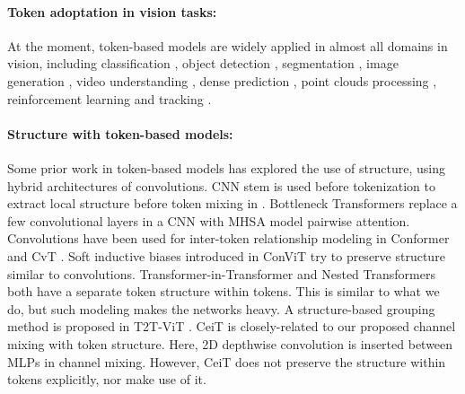 \documentclass[10pt,twocolumn,letterpaper]{article}
\begin{document}
\paragraph{Token adoptation in vision tasks:} At the moment, token-based models are widely applied in almost all domains in vision, including classification \cite{dosovitskiy2020image, touvron2021deit, liu2021swin}, object detection \cite{zhu2020deformable, carion2020end, dai2021up}, segmentation \cite{xie2021segformer, duke2021sstvos}, image generation \cite{liang2021swinir, cao2021video, esser2021taming, jiang2021transgan, deng2021stytr}, video understanding \cite{lee2020parameter, nagrani2021attention, fan2021multiscale, girdhar2021anticipative, bertasius2021space, akbari2021vatt, liu2021video, arnab2021vivit, zhang2021vidtr, liu2021end, chen2021mm, sharir2021image}, dense prediction \cite{yang2021transformer, ranftl2021vision}, point clouds processing \cite{zhao2021point, guo2021pct}, reinforcement learning \cite{chen2021decision, janner2021reinforcement} and tracking \cite{sun2020transtrack}.

\paragraph{Structure with token-based models:} Some prior work in token-based models has explored the use of structure, using hybrid architectures of convolutions. CNN stem is used before tokenization to extract local structure before token mixing in \cite{xiao2021early}. Bottleneck Transformers replace a few convolutional layers in a CNN with MHSA \cite{srinivas2021bottleneck} model pairwise attention. Convolutions have been used for inter-token relationship modeling in Conformer \cite{peng2021conformer} and CvT \cite{wu2021cvt}. Soft inductive biases introduced in ConViT \cite{d2021convit} try to preserve structure similar to convolutions. Transformer-in-Transformer \cite{han2021transformer} and Nested Transformers \cite{zhang2021aggregating} both have a separate token structure within tokens. This is similar to what we do, but such modeling makes the networks heavy. A structure-based grouping method is proposed in T2T-ViT \cite{yuan2021tokens}. CeiT \cite{yuan2021incorporating} is closely-related to our proposed channel mixing with token structure. Here, 2D depthwise convolution is inserted between MLPs in channel mixing. However, CeiT does not preserve the structure within tokens explicitly, nor make use of it.


\vspace{-2mm}
\end{document}
